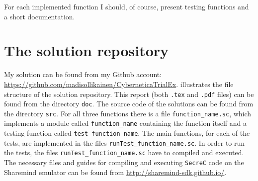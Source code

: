 \documentclass[11pt]{article}
\newcommand{\ct}[1]{\texttt{#1}}
\newcommand{\SC}{\ct{SecreC}\xspace}
\begin{document}
For each implemented function I should, of course, present testing functions and a short documentation. 


\section{The solution repository} %
\label{sec:the_solution_repository}

My solution can be found from my Github account: \url{https://github.com/madisollikainen/CyberneticaTrialEx}.  illustrates the file structure of the solution repository. This report (both \ct{.tex} and \ct{.pdf} files) can be found from the directory \ct{doc}. The source code of the solutions can be found from the directory \ct{src}. For all three functions there is a file \ct{function\_name.sc}, which implements a module called \ct{function\_name} containing the function itself and a testing function called \ct{test\_function\_name}. The main functions, for each of the tests, are implemented in the files \ct{runTest\_function\_name.sc}. In order to run the tests, the files \ct{runTest\_function\_name.sc} have to compiled and executed. The necessary files and guides for compiling and executing \SC code on the Sharemind emulator can be found from \url{http://sharemind-sdk.github.io/}.


\end{document}
